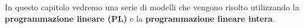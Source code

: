 \documentclass[\main/main.tex]{subfiles}
\begin{document}
In questo capitolo vedremo una serie di modelli che vengono risolto utilizzando la \textbf{programmazione lineare (PL)} e la \textbf{programmazione lineare intera}.



\end{document}
